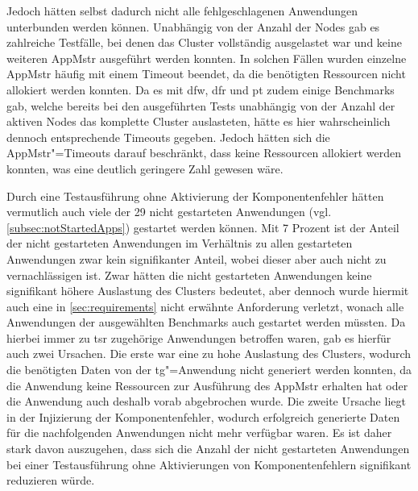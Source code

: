 Jedoch hätten selbst dadurch \uU nicht alle fehlgeschlagenen Anwendungen unterbunden werden können.
Unabhängig von der Anzahl der Nodes gab es zahlreiche Testfälle, bei denen das Cluster vollständig ausgelastet war und keine weiteren \gls{AppMstr} ausgeführt werden konnten.
In solchen Fällen wurden einzelne \gls{AppMstr} häufig mit einem Timeout beendet, da die benötigten Ressourcen nicht allokiert werden konnten.
Da es mit \acrlong{dfw}, \acrlong{dfr} und \acrlong{pt} zudem einige Benchmarks gab, welche bereits bei den ausgeführten Tests unabhängig von der Anzahl der aktiven Nodes das komplette Cluster auslasteten, hätte es hier wahrscheinlich dennoch entsprechende Timeouts gegeben.
Jedoch hätten sich die \gls{AppMstr}"=Timeouts darauf beschränkt, dass keine Ressourcen allokiert werden konnten, was eine deutlich geringere Zahl gewesen wäre.

Durch eine Testausführung ohne Aktivierung der Komponentenfehler hätten vermutlich auch viele der 29 nicht gestarteten Anwendungen (vgl. \cref{subsec:notStartedApps}) gestartet werden können.
Mit 7 Prozent ist der Anteil der nicht gestarteten Anwendungen im Verhältnis zu allen gestarteten Anwendungen zwar kein signifikanter Anteil, wobei dieser aber auch nicht zu vernachlässigen ist.
Zwar hätten die nicht gestarteten Anwendungen keine signifikant höhere Auslastung des Clusters bedeutet, aber dennoch wurde hiermit auch eine in \cref{sec:requirements} nicht erwähnte Anforderung verletzt, wonach alle Anwendungen der ausgewählten Benchmarks auch gestartet werden müssten.
Da hierbei immer zu \acrlong{tsr} zugehörige Anwendungen betroffen waren, gab es hierfür auch zwei Ursachen.
Die erste war eine zu hohe Auslastung des Clusters, wodurch die benötigten Daten von der \acrlong{tg}"=Anwendung nicht generiert werden konnten, da die Anwendung keine Ressourcen zur Ausführung des \gls{AppMstr} erhalten hat oder die Anwendung auch deshalb vorab abgebrochen wurde.
Die zweite Ursache liegt in der Injizierung der Komponentenfehler, wodurch erfolgreich generierte Daten für die nachfolgenden Anwendungen nicht mehr verfügbar waren.
Es ist daher stark davon auszugehen, dass sich die Anzahl der nicht gestarteten Anwendungen bei einer Testausführung ohne Aktivierungen von Komponentenfehlern signifikant reduzieren würde.

